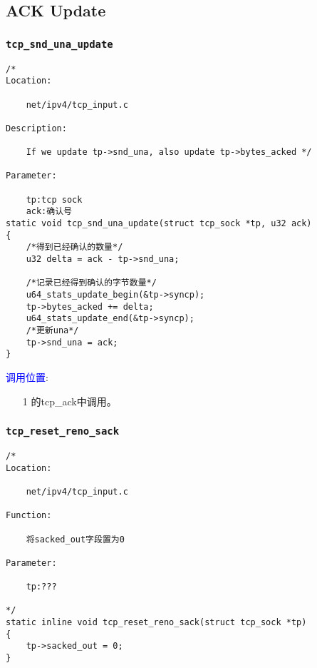 	\subsection{ACK Update}
		\subsubsection{\texttt{tcp_snd_una_update}}
			\label{ACKUpdate:tcp_snd_una_update}
\begin{verbatim}
/* 
Location:

	net/ipv4/tcp_input.c

Description:

	If we update tp->snd_una, also update tp->bytes_acked */

Parameter:
	
	tp:tcp sock
	ack:确认号
static void tcp_snd_una_update(struct tcp_sock *tp, u32 ack)
{
	/*得到已经确认的数量*/
	u32 delta = ack - tp->snd_una;

	/*记录已经得到确认的字节数量*/
	u64_stats_update_begin(&tp->syncp);
	tp->bytes_acked += delta;
	u64_stats_update_end(&tp->syncp);
	/*更新una*/
	tp->snd_una = ack;
}
\end{verbatim}

		\textcolor{blue}{调用位置}:
			\begin{enumerate}
				\item[1]		\label{ClientReceiveSYN+ACK:tcp_ack}的tcp\_ack中调用。
			\end{enumerate}

        \subsubsection{\texttt{tcp_reset_reno_sack}}
\begin{verbatim}
/*
Location:

    net/ipv4/tcp_input.c

Function:

    将sacked_out字段置为0

Parameter:

    tp:???

*/
static inline void tcp_reset_reno_sack(struct tcp_sock *tp)
{
    tp->sacked_out = 0;
}
\end{verbatim}    

